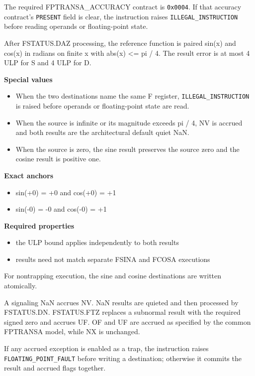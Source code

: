The required FPTRANSA\_ACCURACY contract is \texttt{0x0004}. If that accuracy contract's \texttt{PRESENT} field is clear, the instruction raises \texttt{ILLEGAL\_INSTRUCTION} before reading operands or floating-point state.

After FSTATUS.DAZ processing, the reference function is paired sin(x) and cos(x) in radians on finite x with abs(x) \textless{}= pi / 4. The result error is at most 4 ULP for S and 4 ULP for D.

\textbf{Special values}\par
\begin{itemize}
\item When the two destinations name the same F register, \texttt{ILLEGAL\_INSTRUCTION} is raised before operands or floating-point state are read.
\item When the source is infinite or its magnitude exceeds pi / 4, NV is accrued and both results are the architectural default quiet NaN.
\item When the source is zero, the sine result preserves the source zero and the cosine result is positive one.
\end{itemize}

\textbf{Exact anchors}\par
\begin{itemize}
\item sin(+0) = +0 and cos(+0) = +1
\item sin(-0) = -0 and cos(-0) = +1
\end{itemize}

\textbf{Required properties}\par
\begin{itemize}
\item the ULP bound applies independently to both results
\item results need not match separate FSINA and FCOSA executions
\end{itemize}

For nontrapping execution, the sine and cosine destinations are written atomically.

A signaling NaN accrues NV. NaN results are quieted and then processed by FSTATUS.DN. FSTATUS.FTZ replaces a subnormal result with the required signed zero and accrues UF. OF and UF are accrued as specified by the common FPTRANSA model, while NX is unchanged.

If any accrued exception is enabled as a trap, the instruction raises \texttt{FLOATING\_POINT\_FAULT} before writing a destination; otherwise it commits the result and accrued flags together.
